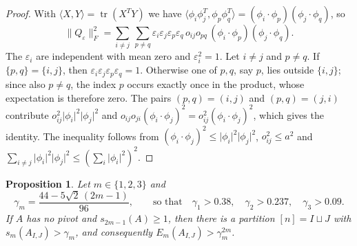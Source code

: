 \documentclass[11pt]{amsart}
\numberwithin{equation}{section}
\newtheorem{proposition}[theorem]{Proposition}
\theoremstyle{definition}
\theoremstyle{remark}
\newcommand{\1}{\mathbf 1}
\DeclareMathOperator{\tr}{tr}
\newcommand{\norm}[1]{\lVert #1\rVert}
\newcommand{\abs}[1]{\lvert #1\rvert}
\begin{document}
\begin{proof}
With $\langle X,Y\rangle=\tr(X^TY)$ we have $\langle\phi_i\phi_j^T,\phi_p\phi_q^T\rangle=(\phi_i\cdot\phi_p)(\phi_j\cdot\phi_q)$, so
\[
\norm{Q_\varepsilon}_F^2=\sum_{i\ne j}\ \sum_{p\ne q}\varepsilon_i\varepsilon_j\varepsilon_p\varepsilon_q\,o_{ij}o_{pq}\,(\phi_i\cdot\phi_p)(\phi_j\cdot\phi_q).
\]
The $\varepsilon_i$ are independent with mean zero and $\varepsilon_i^2=1$. Let $i\ne j$ and $p\ne q$. If $\{p,q\}=\{i,j\}$, then $\varepsilon_i\varepsilon_j\varepsilon_p\varepsilon_q=1$. Otherwise one of $p,q$, say $p$, lies outside $\{i,j\}$; since also $p\ne q$, the index $p$ occurs exactly once in the product, whose expectation is therefore zero. The pairs $(p,q)=(i,j)$ and $(p,q)=(j,i)$ contribute $o_{ij}^2\abs{\phi_i}^2\abs{\phi_j}^2$ and $o_{ij}o_{ji}(\phi_i\cdot\phi_j)^2=o_{ij}^2(\phi_i\cdot\phi_j)^2$, which gives the identity. The inequality follows from $(\phi_i\cdot\phi_j)^2\le\abs{\phi_i}^2\abs{\phi_j}^2$, $o_{ij}^2\le a^2$ and $\sum_{i\ne j}\abs{\phi_i}^2\abs{\phi_j}^2\le(\sum_i\abs{\phi_i}^2)^2$.
\end{proof}

\begin{proposition}\label{prop:signs}
Let $m\in\{1,2,3\}$ and
\[
\gamma_m=\frac{44-5\sqrt2\,(2m-1)}{96},\qquad\text{so that}\quad\gamma_1>0.38,\quad\gamma_2>0.237,\quad\gamma_3>0.09 .
\]
If $A$ has no pivot and $s_{2m-1}(A)\ge1$, then there is a partition $[n]=I\sqcup J$ with $s_m(A_{I,J})>\gamma_m$, and consequently $E_m(A_{I,J})>\gamma_m^{2m}$.
\end{proposition}
\end{document}

